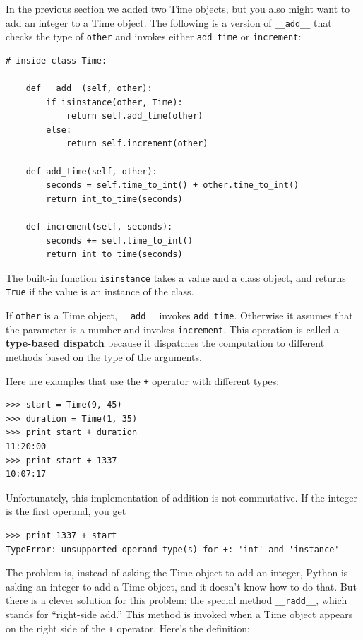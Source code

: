 \documentclass[12pt,a4paper,final,twoside,onecolumn,titlepage]{book}
\begin{document}
In the previous section we added two Time objects, but you
also might want to add an integer to a Time object.  The
following is a version of \verb"__add__"
that checks the type of {\tt other} and invokes either
\verb"add_time" or {\tt increment}:

\begin{verbatim}
# inside class Time:

    def __add__(self, other):
        if isinstance(other, Time):
            return self.add_time(other)
        else:
            return self.increment(other)

    def add_time(self, other):
        seconds = self.time_to_int() + other.time_to_int()
        return int_to_time(seconds)

    def increment(self, seconds):
        seconds += self.time_to_int()
        return int_to_time(seconds)
\end{verbatim}
%
The built-in function {\tt isinstance} takes a value and a
class object, and returns {\tt True} if the value is an instance
of the class.

If {\tt other} is a Time object, \verb"__add__" invokes
\verb"add_time".  Otherwise it assumes that the parameter
is a number and invokes {\tt increment}.  This operation is
called a {\bf type-based dispatch} because it dispatches the
computation to different methods based on the type of the
arguments.

Here are examples that use the {\tt +} operator with different
types:

\begin{verbatim}
>>> start = Time(9, 45)
>>> duration = Time(1, 35)
>>> print start + duration
11:20:00
>>> print start + 1337
10:07:17
\end{verbatim}
%
Unfortunately, this implementation of addition is not commutative.
If the integer is the first operand, you get

\begin{verbatim}
>>> print 1337 + start
TypeError: unsupported operand type(s) for +: 'int' and 'instance'
\end{verbatim}
%
The problem is, instead of asking the Time object to add an integer,
Python is asking an integer to add a Time object, and it doesn't know
how to do that.  But there is a clever solution for this problem: the
special method \verb"__radd__", which stands for ``right-side add.''
This method is invoked when a Time object appears on the right side of
the {\tt +} operator.  Here's the definition:
\end{document}
